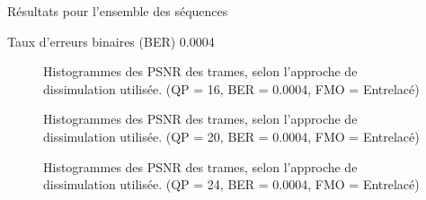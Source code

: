\begin{section}{Résultats pour l'ensemble des séquences}
\begin{subsection}{Taux d'erreurs binaires (BER) 0.0004}
\begin{figure} 
\caption[]{Histogrammes des PSNR des trames, selon l'approche de dissimulation
utilisée. (QP = 16, BER = 0.0004, FMO = Entrelacé)}
\label{fig-HistAllDInterlaced16x4}
\end{figure}

\begin{figure} 
\caption[]{Histogrammes des PSNR des trames, selon l'approche de dissimulation
utilisée. (QP = 20, BER = 0.0004, FMO = Entrelacé)}
\label{fig-HistAllDInterlaced20x4}
\end{figure}

\begin{figure} 
\caption[]{Histogrammes des PSNR des trames, selon l'approche de dissimulation
utilisée. (QP = 24, BER = 0.0004, FMO = Entrelacé)}
\label{fig-HistAllDInterlaced24x4}
\end{figure}


\end{subsection}
\end{section}
